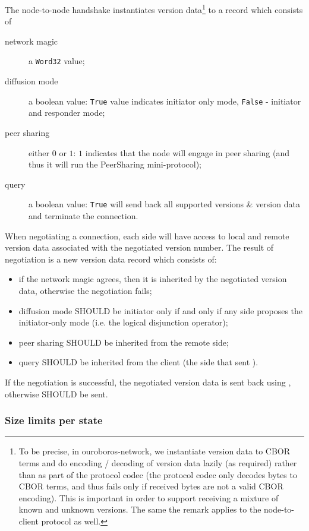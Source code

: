 The node-to-node handshake instantiates version data\footnote{To be precise, in
ouroboros-network, we instantiate version data to CBOR terms and do encoding
/ decoding of version data lazily (as required) rather than as part of the
protocol codec (the protocol codec only decodes bytes to CBOR terms, and thus
fails only if received bytes are not a valid CBOR encoding).  This is important
in order to support receiving a mixture of known and unknown versions. The same
the remark applies to the node-to-client protocol as well.} to a record which consists
of
\begin{description}
  \item[network magic] a \texttt{Word32} value;
  \item[diffusion mode] a boolean value: \texttt{True} value indicates
    initiator only mode, \texttt{False} - initiator and responder mode;
  \item[peer sharing] either $0$ or $1$: $1$ indicates that the node
    will engage in peer sharing (and thus it will run the PeerSharing
    mini-protocol);
  \item[query] a boolean value: \texttt{True} will send back all supported
    versions \& version data and terminate the connection.
\end{description}

When negotiating a connection, each side will have access to local and remote
version data associated with the negotiated version number.  The result of
negotiation is a new version data record which consists of:
\begin{itemize}\label{alg:node-to-node-negotiation}
  \item if the network magic agrees, then it is inherited by the negotiated version
    data, otherwise the negotiation fails;
  \item diffusion mode SHOULD be initiator only if and only if any side proposes the
    initiator-only mode (i.e. the logical disjunction operator);
  \item peer sharing SHOULD be inherited from the remote side;
  \item query SHOULD be inherited from the client (the side that sent
      \MsgProposeVersions{}).
\end{itemize}
If the negotiation is successful, the negotiated version data is sent back
using \MsgAcceptVersion{}, otherwise \MsgRefuse{} SHOULD be sent.

\subsubsection{Size limits per state}

